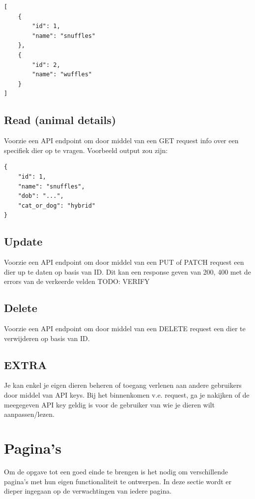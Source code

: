 \documentclass{article}
\begin{document}
\begin{verbatim}
[
    {
        "id": 1,
        "name": "snuffles"
    },
    {
        "id": 2,
        "name": "wuffles"
    }
]
\end{verbatim}

\subsection{Read (animal details)}
Voorzie een API endpoint om door middel van een GET request info over een specifiek dier op te vragen. Voorbeeld output zou zijn:

\begin{verbatim}
{
    "id": 1,
    "name": "snuffles",
    "dob": "...",
    "cat_or_dog": "hybrid"
}
\end{verbatim}


\subsection{Update}
Voorzie een API endpoint om door middel van een PUT of PATCH request een dier up te daten op basis van ID. Dit kan een response geven van 200, 400 met de errors van de verkeerde velden TODO: VERIFY

\subsection{Delete}
Voorzie een API endpoint om door middel van een DELETE request een dier te verwijderen op basis van ID.

\subsection{EXTRA}
Je kan enkel je eigen dieren beheren of toegang verlenen aan andere gebruikers door middel van API keys. Bij het binnenkomen v.e. request, ga je nakijken of de meegegeven API key geldig is voor de gebruiker van wie je dieren wilt aanpassen/lezen.

\section{Pagina's}
Om de opgave tot een goed einde te brengen is het nodig om verschillende pagina's met hun eigen functionaliteit te ontwerpen. In deze sectie wordt er dieper ingegaan op de verwachtingen van iedere pagina.
\end{document}
